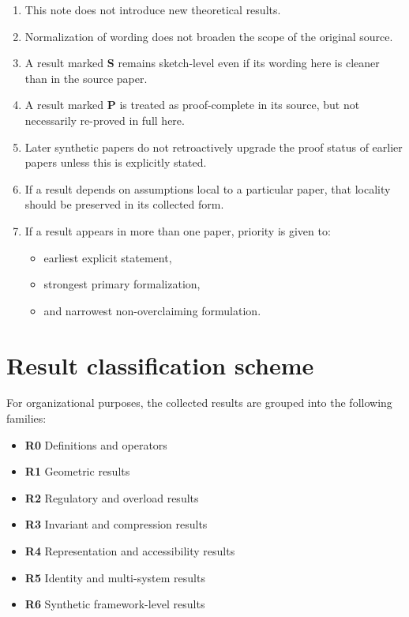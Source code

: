 \documentclass[12pt]{article}
\begin{document}
	\begin{enumerate}[leftmargin=2em]
		\item This note does not introduce new theoretical results.
		\item Normalization of wording does not broaden the scope of the original source.
		\item A result marked \textbf{S} remains sketch-level even if its wording here is cleaner than in the source paper.
		\item A result marked \textbf{P} is treated as proof-complete in its source, but not necessarily re-proved in full here.
		\item Later synthetic papers do not retroactively upgrade the proof status of earlier papers unless this is explicitly stated.
		\item If a result depends on assumptions local to a particular paper, that locality should be preserved in its collected form.
		\item If a result appears in more than one paper, priority is given to:
		\begin{itemize}[leftmargin=2em]
			\item earliest explicit statement,
			\item strongest primary formalization,
			\item and narrowest non-overclaiming formulation.
		\end{itemize}
	\end{enumerate}
	
	\section{Result classification scheme}
	
	For organizational purposes, the collected results are grouped into the following families:
	
	\begin{itemize}[leftmargin=2em]
		\item \textbf{R0} Definitions and operators
		\item \textbf{R1} Geometric results
		\item \textbf{R2} Regulatory and overload results
		\item \textbf{R3} Invariant and compression results
		\item \textbf{R4} Representation and accessibility results
		\item \textbf{R5} Identity and multi-system results
		\item \textbf{R6} Synthetic framework-level results
	\end{itemize}
	
\end{document}
